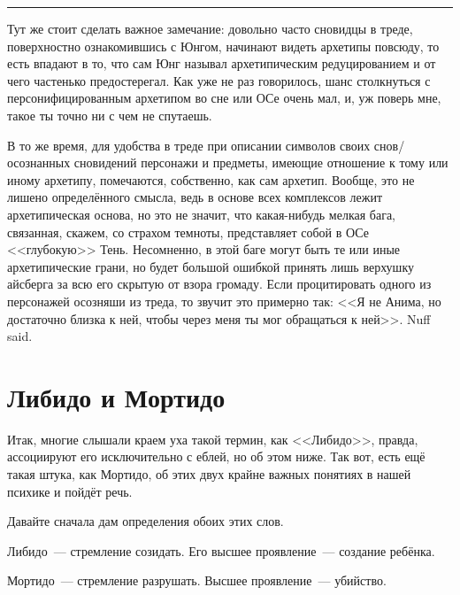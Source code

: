 \documentclass[a4paper,14pt,oneside]{memoir}
\begin{document}
\fancybreak{* * *}

Тут же стоит сделать важное замечание: довольно часто сновидцы в треде, поверхностно ознакомившись с Юнгом, начинают видеть архетипы повсюду, то есть впадают в то, что сам Юнг называл архетипическим редуцированием и от чего частенько предостерегал. Как уже не раз говорилось, шанс столкнуться с персонифицированным архетипом во сне или ОСе очень мал, и, уж поверь мне, такое ты точно ни с чем не спутаешь. 

В то же время, для удобства в треде при описании символов своих снов/о\-со\-знан\-ных сно\-ви\-де\-ний персонажи и предметы, имеющие отношение к тому или иному архетипу, помечаются, собственно, как сам архетип. Вообще, это не лишено определённого смысла, ведь в основе всех комплексов лежит архетипическая основа, но это не значит, что какая-нибудь мелкая бага, связанная, скажем, со страхом темноты, представляет собой в ОСе <<глубокую>> Тень. Несомненно, в этой баге могут быть те или иные архетипические грани, но будет большой ошибкой принять лишь верхушку айсберга за всю его скрытую от взора громаду. Если процитировать одного из персонажей осозняши из треда, то звучит это примерно так: <<Я не Анима, но достаточно близка к ней, чтобы через меня ты мог обращаться к ней>>. Nuff said.




\section{Либидо и Мортидо}


\medskip

Итак, многие слышали краем уха такой термин, как <<Либидо>>, правда, ассоциируют его исключительно с еблей, но об этом ниже. Так вот, есть ещё такая штука, как Мортидо, об этих двух крайне важных понятиях в нашей психике и пойдёт речь. 

Давайте сначала дам определения обоих этих слов. 

Либидо~--- стремление созидать. Его высшее проявление~--- создание ребёнка.

Мортидо~--- стремление разрушать. Высшее проявление~--- убийство. 
\end{document}
